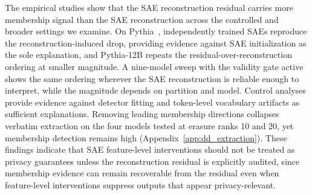 The empirical studies show that the SAE reconstruction residual carries more membership signal than the SAE reconstruction across the controlled and broader settings we examine. On Pythia~\citep{biderman2023pythia}, independently trained SAEs reproduce the reconstruction-induced drop, providing evidence against SAE initialization as the sole explanation, and Pythia-12B repeats the residual-over-reconstruction ordering at smaller magnitude. A nine-model sweep with the validity gate active shows the same ordering wherever the SAE reconstruction is reliable enough to interpret, while the magnitude depends on partition and model. Control analyses provide evidence against detector fitting and token-level vocabulary artifacts as sufficient explanations. Removing leading membership directions collapses verbatim extraction on the four models tested at erasure ranks 10 and 20, yet membership detection remains high (Appendix~\ref{app:dd_extraction}). These findings indicate that SAE feature-level interventions should not be treated as privacy guarantees unless the reconstruction residual is explicitly audited, since membership evidence can remain recoverable from the residual even when feature-level interventions suppress outputs that appear privacy-relevant.
